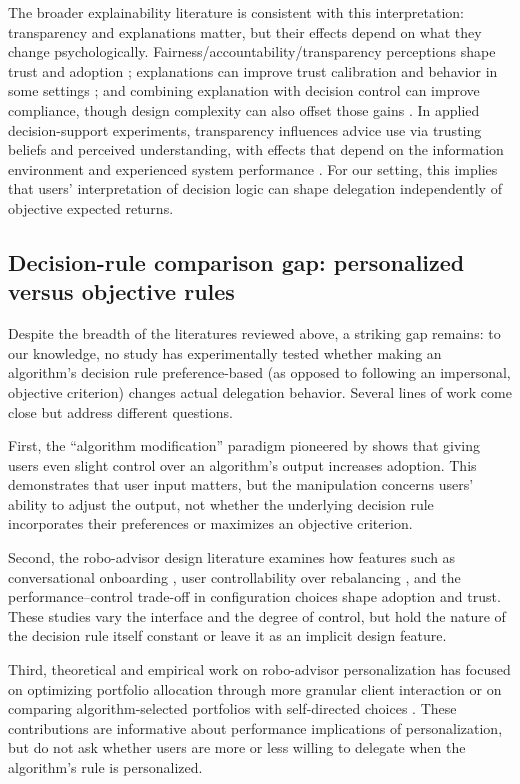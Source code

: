 \documentclass[a4paper, 12pt, fleqn]{article}
\theoremstyle{definition}
\begin{document}
The broader explainability literature is consistent with this interpretation: transparency and explanations matter, but their effects depend on what they change psychologically. Fairness/accountability/transparency perceptions shape trust and adoption \citep{Shin2019}; explanations can improve trust calibration and behavior in some settings \citep{Leichtmann2023}; and combining explanation with decision control can improve compliance, though design complexity can also offset those gains \citep{Westphal2023}. In applied decision-support experiments, transparency influences advice use via trusting beliefs and perceived understanding, with effects that depend on the information environment and experienced system performance \citep{Ning2024,Sun2026}. For our setting, this implies that users' interpretation of decision logic can shape delegation independently of objective expected returns.

\subsection{Decision-rule comparison gap: personalized versus objective rules}
Despite the breadth of the literatures reviewed above, a striking gap remains: to our knowledge, no study has experimentally tested whether making an algorithm's decision rule preference-based (as opposed to following an impersonal, objective criterion) changes actual delegation behavior. Several lines of work come close but address different questions.

First, the ``algorithm modification'' paradigm pioneered by \citet{Dietvorst2018} shows that giving users even slight control over an algorithm's output increases adoption. This demonstrates that user input matters, but the manipulation concerns users' ability to adjust the output, not whether the underlying decision rule incorporates their preferences or maximizes an objective criterion.

Second, the robo-advisor design literature examines how features such as conversational onboarding \citep{Hildebrand2021}, user controllability over rebalancing \citep{Kim2025ICIS}, and the performance--control trade-off in configuration choices \citep{Ruehr2020} shape adoption and trust. These studies vary the interface and the degree of control, but hold the nature of the decision rule itself constant or leave it as an implicit design feature.

Third, theoretical and empirical work on robo-advisor personalization has focused on optimizing portfolio allocation through more granular client interaction \citep{Capponi2022} or on comparing algorithm-selected portfolios with self-directed choices \citep{BouluReshef2026}. These contributions are informative about performance implications of personalization, but do not ask whether users are more or less willing to delegate when the algorithm's rule is personalized.
\end{document}
